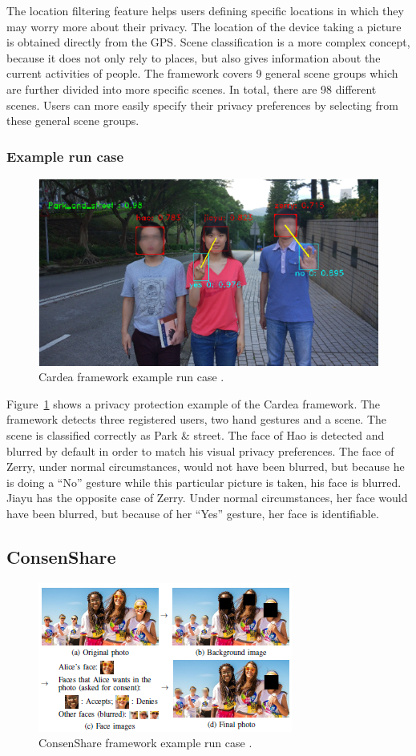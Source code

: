 \documentclass[conference]{IEEEtran}
\begin{document}
The location filtering feature helps users defining specific locations in which they may worry more about their privacy. The location of the device taking a picture is obtained directly from the \ac{GPS}. Scene classification is a more complex concept, because it does not only rely to places, but also gives information about the current activities of people. The framework covers 9 general scene groups which are further divided into more specific scenes. In total, there are 98 different scenes. Users can more easily specify their privacy preferences by selecting from these general scene groups. 


\subsubsection{Example run case}
\begin{figure}[t]
\centerline{\includegraphics[width=.5\textwidth]{img/cardea_example.png}}
\caption{Cardea framework example run case \cite{shu2016cardea}.}
\label{fig:cardea3}
\end{figure}

Figure~\ref{fig:cardea3} shows a privacy protection example of the Cardea framework. The framework detects three registered users, two hand gestures and a scene. The scene is classified correctly as Park \& street. The face of Hao is detected and blurred by default in order to match his visual privacy preferences. The face of Zerry, under normal circumstances, would not have been blurred, but because he is doing a “No” gesture while this particular picture is taken, his face is blurred. Jiayu has the opposite case of Zerry. Under normal circumstances, her face would have been blurred, but because of her “Yes” gesture, her face is identifiable.


\subsection{ConsenShare}\label{ConsenShare}
\begin{figure}[t]
\centerline{\includegraphics[width=.5\textwidth]{img/consen_example.png}}
\caption{ConsenShare framework example run case \cite{olteanu2018consensual}.}
\label{fig:consen}
\end{figure}
\end{document}
